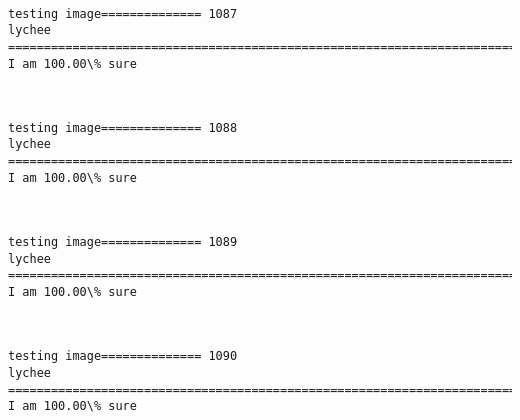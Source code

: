 \documentclass[11pt]{article}
\begin{document}
    \begin{center}
    \end{center}
    { \hspace*{\fill} \\}
    
    \begin{Verbatim}[commandchars=\\\{\}]
testing image============== 1087
lychee
============================================================================
I am 100.00\% sure

    \end{Verbatim}

    \begin{center}
    \end{center}
    { \hspace*{\fill} \\}
    
    \begin{Verbatim}[commandchars=\\\{\}]
testing image============== 1088
lychee
============================================================================
I am 100.00\% sure

    \end{Verbatim}

    \begin{center}
    \end{center}
    { \hspace*{\fill} \\}
    
    \begin{Verbatim}[commandchars=\\\{\}]
testing image============== 1089
lychee
============================================================================
I am 100.00\% sure

    \end{Verbatim}

    \begin{center}
    \end{center}
    { \hspace*{\fill} \\}
    
    \begin{Verbatim}[commandchars=\\\{\}]
testing image============== 1090
lychee
============================================================================
I am 100.00\% sure

    \end{Verbatim}
\end{document}
